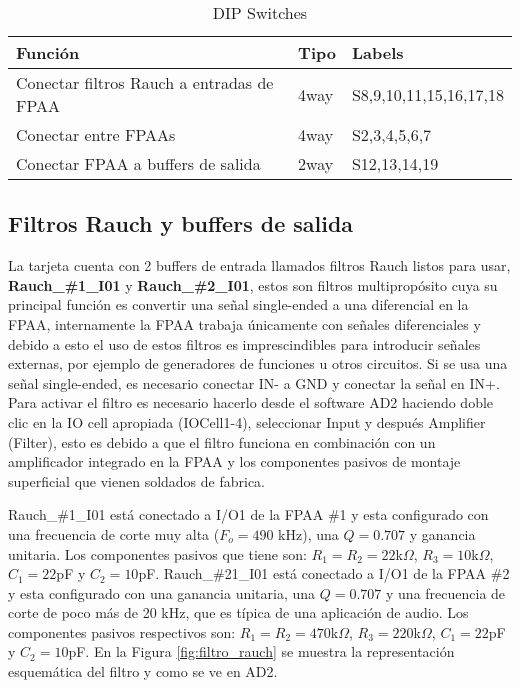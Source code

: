 	\begin{table}[!ht]
		\centering
		\begin{tabular}{|l|l|l|}
			\hline
			\textbf{Función} &  \textbf{Tipo} & \textbf{Labels}\\
			\hline
			Conectar filtros Rauch a entradas de FPAA 					& 4way 		& S8,9,10,11,15,16,17,18		\\
			\hline
			Conectar entre FPAAs 										& 4way 		& S2,3,4,5,6,7					\\
			\hline
			Conectar FPAA a buffers de salida 							& 2way 		& S12,13,14,19					\\
			\hline
		\end{tabular}
		\caption{DIP Switches}
		\label{tab:switches}
	\end{table}

		\subsection{Filtros Rauch y buffers de salida}
	
	La tarjeta cuenta con 2 buffers de entrada llamados filtros Rauch listos para usar, \textbf{Rauch\_\#1\_I01} y \textbf{Rauch\_\#2\_I01}, estos son filtros multipropósito cuya su principal función es convertir una señal single-ended a una diferencial en la FPAA, internamente la FPAA trabaja únicamente con señales diferenciales y debido a esto el uso de estos filtros es imprescindibles para introducir señales externas, por ejemplo de generadores de funciones u otros circuitos. Si se usa una señal single-ended, es necesario conectar IN- a GND y conectar la señal en IN+.
	Para activar el filtro es necesario hacerlo desde el software AD2 haciendo doble clic en la IO cell apropiada (IOCell1-4), seleccionar Input y después Amplifier (Filter), esto es debido a que el filtro funciona en combinación con un amplificador integrado en la FPAA y los componentes pasivos de montaje superficial que vienen soldados de fabrica.
	
	Rauch\_\#1\_I01 está conectado a I/O1 de la FPAA \#1 y esta configurado con una frecuencia de corte muy alta ($F_{o} = 490$ kHz), una $Q = 0.707$ y ganancia unitaria. Los componentes pasivos que tiene son: $R_{1} = R_{2} = 22$k$\Omega$, $R_{3} = 10$k$\Omega$, $C_{1} = 22$pF y $C_{2} = 10$pF.  Rauch\_\#21\_I01 está conectado a I/O1 de la FPAA \#2 y esta configurado con una ganancia unitaria, una $Q = 0.707$ y una frecuencia de corte de poco más de 20 kHz, que es típica de una aplicación de audio. Los componentes pasivos respectivos son: $R_{1} = R_{2} = 470$k$\Omega$, $R_{3} = 220$k$\Omega$, $C_{1} = 22$pF y $C_{2} = 10$pF. 	En la Figura \ref{fig:filtro_rauch} se muestra la representación esquemática del filtro y como se ve en AD2.
	
